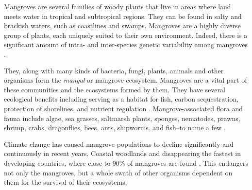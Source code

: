 Mangroves are several families of woody plants that live in areas where
land meets water in tropical and subtropical regions. They can be found
in salty and brackish waters, such as coastlines and swamps. Mangroves
are a highly diverse group of plants, each uniquely suited to their own
environment. Indeed, there is a significant amount of intra- and
inter-species genetic variability among mangroves \cite{biologyOfMangroves}.

They, along with many kinds of bacteria, fungi, plants, animals and
other organisms form the \emph{mangal} or mangrove ecosystem. Mangroves
are a vital part of these communities and the ecosystems formed by them.
They have several ecological benefits including serving as a habitat for 
fish, carbon sequestration, protection of shorelines, and nutrient
regulation \cite{roleOfMangroves}. Mangrove-associated flora and fauna include algae,
sea grasses, saltmarsh plants, sponges, nematodes, prawns, shrimp,
crabs, dragonflies, bees, ants, shipworms, and fish--to name a few \cite{biologyOfMangroves}.

Climate change has caused mangrove populations to decline significantly
and continuously in recent years. Coastal woodlands and disappearing the
fastest in developing countries, where close to 90\% of mangroves are
found \cite{kavanagh2007}. This endangers not only the mangroves, but a whole swath
of other organisms dependent on them for the survival of their
ecosystems.